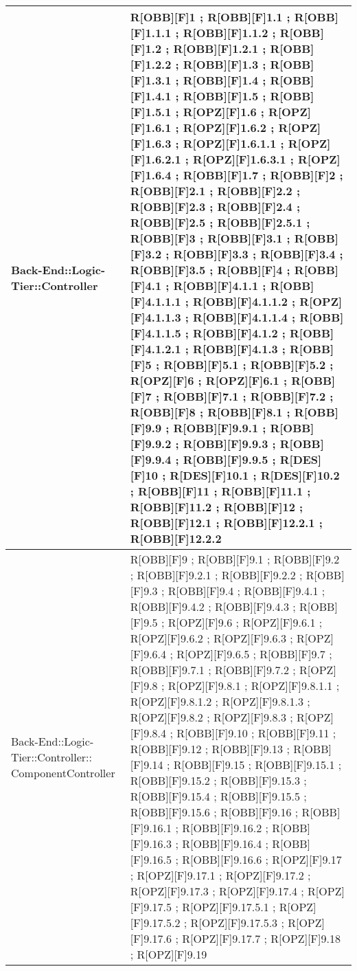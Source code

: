 \begin{table}[h]
\begin{tabular}{|p{}|p{}|}
			Back-End::Logic-Tier::Controller & R[OBB][F]1 ; R[OBB][F]1.1 ; R[OBB][F]1.1.1 ; R[OBB][F]1.1.2 ; R[OBB][F]1.2 ; R[OBB][F]1.2.1 ; R[OBB][F]1.2.2 ; R[OBB][F]1.3 ; R[OBB][F]1.3.1 ; R[OBB][F]1.4 ; R[OBB][F]1.4.1 ; R[OBB][F]1.5 ; R[OBB][F]1.5.1 ; R[OPZ][F]1.6 ; R[OPZ][F]1.6.1 ; R[OPZ][F]1.6.2 ; R[OPZ][F]1.6.3 ; R[OPZ][F]1.6.1.1 ; R[OPZ][F]1.6.2.1 ; R[OPZ][F]1.6.3.1 ; R[OPZ][F]1.6.4 ; R[OBB][F]1.7 ; R[OBB][F]2 ; R[OBB][F]2.1 ; R[OBB][F]2.2 ; R[OBB][F]2.3 ; R[OBB][F]2.4 ; R[OBB][F]2.5 ; R[OBB][F]2.5.1 ; R[OBB][F]3 ; R[OBB][F]3.1 ; R[OBB][F]3.2 ; R[OBB][F]3.3 ; R[OBB][F]3.4 ; R[OBB][F]3.5 ;  R[OBB][F]4 ; R[OBB][F]4.1 ; R[OBB][F]4.1.1 ; R[OBB][F]4.1.1.1 ; R[OBB][F]4.1.1.2 ; R[OPZ][F]4.1.1.3 ; R[OBB][F]4.1.1.4 ; R[OBB][F]4.1.1.5 ; R[OBB][F]4.1.2 ; R[OBB][F]4.1.2.1 ; R[OBB][F]4.1.3 ; R[OBB][F]5 ; R[OBB][F]5.1 ; R[OBB][F]5.2 ; R[OPZ][F]6 ; R[OPZ][F]6.1 ; R[OBB][F]7 ; R[OBB][F]7.1 ; R[OBB][F]7.2 ; R[OBB][F]8 ; R[OBB][F]8.1 ; R[OBB][F]9.9 ; R[OBB][F]9.9.1 ; R[OBB][F]9.9.2 ; R[OBB][F]9.9.3 ; R[OBB][F]9.9.4 ; R[OBB][F]9.9.5 ; R[DES][F]10 ; R[DES][F]10.1 ; R[DES][F]10.2 ; R[OBB][F]11 ; R[OBB][F]11.1 ; R[OBB][F]11.2 ; R[OBB][F]12 ; R[OBB][F]12.1 ; R[OBB][F]12.2.1 ; R[OBB][F]12.2.2 \\ \midrule
			Back-End::Logic-Tier::Controller:: ComponentController & R[OBB][F]9 ; R[OBB][F]9.1 ; R[OBB][F]9.2 ; R[OBB][F]9.2.1 ; R[OBB][F]9.2.2 ; R[OBB][F]9.3 ; R[OBB][F]9.4 ; R[OBB][F]9.4.1 ; R[OBB][F]9.4.2 ; R[OBB][F]9.4.3 ; R[OBB][F]9.5 ; R[OPZ][F]9.6 ; R[OPZ][F]9.6.1 ; R[OPZ][F]9.6.2 ; R[OPZ][F]9.6.3 ; R[OPZ][F]9.6.4 ; R[OPZ][F]9.6.5 ; R[OBB][F]9.7 ; R[OBB][F]9.7.1 ; R[OBB][F]9.7.2 ; R[OPZ][F]9.8 ; R[OPZ][F]9.8.1 ; R[OPZ][F]9.8.1.1 ; R[OPZ][F]9.8.1.2 ; R[OPZ][F]9.8.1.3 ; R[OPZ][F]9.8.2 ; R[OPZ][F]9.8.3 ; R[OPZ][F]9.8.4 ; R[OBB][F]9.10 ; R[OBB][F]9.11 ; R[OBB][F]9.12 ; R[OBB][F]9.13 ; R[OBB][F]9.14 ; R[OBB][F]9.15 ; R[OBB][F]9.15.1 ; R[OBB][F]9.15.2 ; R[OBB][F]9.15.3 ; R[OBB][F]9.15.4 ; R[OBB][F]9.15.5 ; R[OBB][F]9.15.6 ; R[OBB][F]9.16 ; R[OBB][F]9.16.1 ; R[OBB][F]9.16.2 ; R[OBB][F]9.16.3 ; R[OBB][F]9.16.4 ; R[OBB][F]9.16.5 ; R[OBB][F]9.16.6 ; R[OPZ][F]9.17 ; R[OPZ][F]9.17.1 ; R[OPZ][F]9.17.2 ; R[OPZ][F]9.17.3 ; R[OPZ][F]9.17.4 ; R[OPZ][F]9.17.5 ; R[OPZ][F]9.17.5.1 ; R[OPZ][F]9.17.5.2 ; R[OPZ][F]9.17.5.3 ; R[OPZ][F]9.17.6 ; R[OPZ][F]9.17.7 ; R[OPZ][F]9.18 ; R[OPZ][F]9.19 \\ \midrule

		\end{tabular}
	\end{table}

